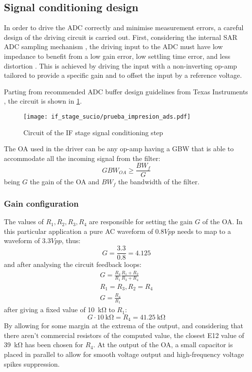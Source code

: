 \subsection{Signal conditioning design}
In order to drive the ADC correctly and minimise measurement errors, a careful design of the driving circuit is carried out. First, considering the internal SAR ADC sampling mechanism \cite[pp.~356,~363]{STMicroelectronics2022a}, the driving input to the ADC must have low impedance to benefit from a low gain error, low settling time error, and less distortion \cite{Franco2014}. This is achieved by driving the input with a non-inverting op-amp tailored to provide a specific gain and to offset the input by a reference voltage.

Parting from recommended ADC buffer design guidelines from Texas Instruments \cite[p.~17]{TexasInstruments2022}, the circuit is shown in \cref{fig:if_cir}.

\begin{figure}[h]
	\centering
	\texttt{[image: if\_stage\_sucio/prueba\_impresion\_ads.pdf]}
	\caption{Circuit of the IF stage signal conditioning step}
	\label{fig:if_cir}
\end{figure}

The OA used in the driver can be any op-amp having a GBW that is able to accommodate all the incoming signal from the filter:
\begin{equation}
	GBW_{OA} \ge \frac{BW_{f}}{G}
\end{equation}
being $G$ the gain of the OA and $BW_{f}$ the bandwidth of the filter.


\subsubsection{Gain configuration}
The values of $R_1, R_2, R_3, R_4$ are responsible for setting the gain $G$ of the OA.
In this particular application a pure AC waveform of $0.8 Vpp$ needs to map to a waveform of $3.3 Vpp$, thus:
\begin{equation}
	G = \frac{3.3}{0.8} = 4.125
\end{equation}
and after analysing the circuit feedback loops:
\begin{gather}
	G = \frac{R_4}{R_1} \frac{R_1+R_2}{R_3+R_4}\\
	R_1 = R_3, R_2=R_4\\
	G= \frac{R_4}{R_1}
\end{gather}
after giving a fixed value of \SI{10}{\kilo\ohm} to $R_1$:
\begin{equation}
	G \cdot \SI{10}{\kilo\ohm} = R_4 = \SI{41.25}{\kilo\ohm}
\end{equation}
By allowing for some margin at the extrema of the output, and considering that there aren't commercial resistors of the computed value, the closest E12 value of \SI{39}{\kilo\ohm} has been chosen for $R_4$.
At the output of the OA, a small capacitor is placed in parallel to allow for smooth voltage output and high-frequency voltage spikes suppression.

